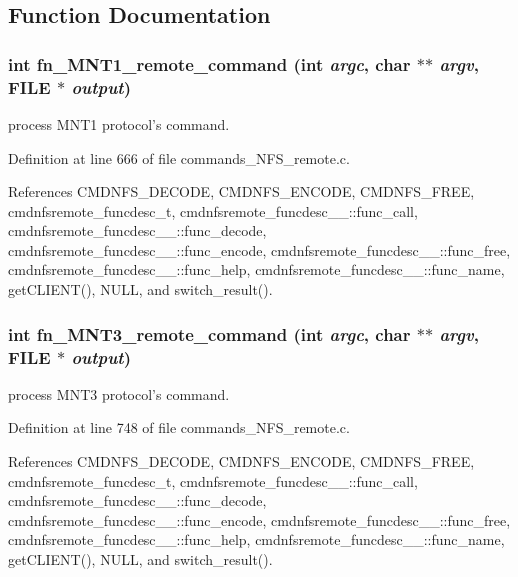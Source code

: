 \subsection{Function Documentation}
\subsubsection{\setlength{\rightskip}{0pt plus 5cm}int fn\_\-MNT1\_\-remote\_\-command (int {\em argc}, char $\ast$$\ast$ {\em argv}, FILE $\ast$ {\em output})}\label{commands__NFS__remote_8c_a36}


process MNT1 protocol's command. 

Definition at line 666 of file commands\_\-NFS\_\-remote.c.

References CMDNFS\_\-DECODE, CMDNFS\_\-ENCODE, CMDNFS\_\-FREE, cmdnfsremote\_\-funcdesc\_\-t, cmdnfsremote\_\-funcdesc\_\-\_\-::func\_\-call, cmdnfsremote\_\-funcdesc\_\-\_\-::func\_\-decode, cmdnfsremote\_\-funcdesc\_\-\_\-::func\_\-encode, cmdnfsremote\_\-funcdesc\_\-\_\-::func\_\-free, cmdnfsremote\_\-funcdesc\_\-\_\-::func\_\-help, cmdnfsremote\_\-funcdesc\_\-\_\-::func\_\-name, get\-CLIENT(), NULL, and switch\_\-result().
\subsubsection{\setlength{\rightskip}{0pt plus 5cm}int fn\_\-MNT3\_\-remote\_\-command (int {\em argc}, char $\ast$$\ast$ {\em argv}, FILE $\ast$ {\em output})}\label{commands__NFS__remote_8c_a37}


process MNT3 protocol's command. 

Definition at line 748 of file commands\_\-NFS\_\-remote.c.

References CMDNFS\_\-DECODE, CMDNFS\_\-ENCODE, CMDNFS\_\-FREE, cmdnfsremote\_\-funcdesc\_\-t, cmdnfsremote\_\-funcdesc\_\-\_\-::func\_\-call, cmdnfsremote\_\-funcdesc\_\-\_\-::func\_\-decode, cmdnfsremote\_\-funcdesc\_\-\_\-::func\_\-encode, cmdnfsremote\_\-funcdesc\_\-\_\-::func\_\-free, cmdnfsremote\_\-funcdesc\_\-\_\-::func\_\-help, cmdnfsremote\_\-funcdesc\_\-\_\-::func\_\-name, get\-CLIENT(), NULL, and switch\_\-result().
